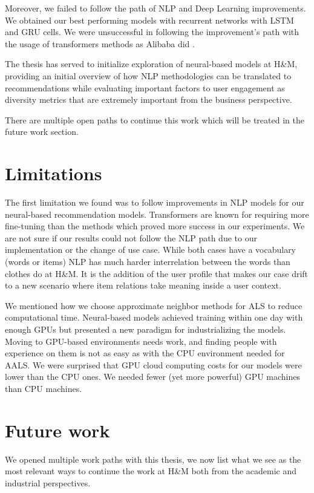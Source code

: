 \documentclass{tex_files/kththesis}
\begin{document}
Moreover, we failed to follow the path of NLP and Deep Learning improvements. We obtained our best performing models with recurrent networks with LSTM and GRU cells. We were unsuccessful in following the improvement's path with the usage of transformers methods as Alibaba did \cite{alibaba, sun2019bert4rec}.

The thesis has served to initialize exploration of neural-based models at H\&M, providing an initial overview of how NLP methodologies can be translated to recommendations while evaluating important factors to user engagement as diversity metrics that are extremely important from the business perspective. 

There are multiple open paths to continue this work which will be treated in the future work section.

\section{Limitations}
The first limitation we found was to follow improvements in NLP models for our neural-based recommendation models. Transformers are known for requiring more fine-tuning than the methods which proved more success in our experiments. We are not sure if our results could not follow the NLP path due to our implementation or the change of use case. While both cases have a vocabulary (words or items) NLP has much harder interrelation between the words than clothes do at H\&M. It is the addition of the user profile that makes our case drift to a new scenario where item relations take meaning inside a user context.

We mentioned how we choose approximate neighbor methods for ALS to reduce computational time. Neural-based models achieved training within one day with enough GPUs but presented a new paradigm for industrializing the models. Moving to GPU-based environments needs work, and finding people with experience on them is not as easy as with the CPU environment needed for AALS. We were surprised that GPU cloud computing costs for our models were lower than the CPU ones. We needed fewer (yet more powerful) GPU machines than CPU machines.

\section{Future work}
We opened multiple work paths with this thesis, we now list what we see as the most relevant ways to continue the work at H\&M both from the academic and industrial perspectives.
\end{document}
